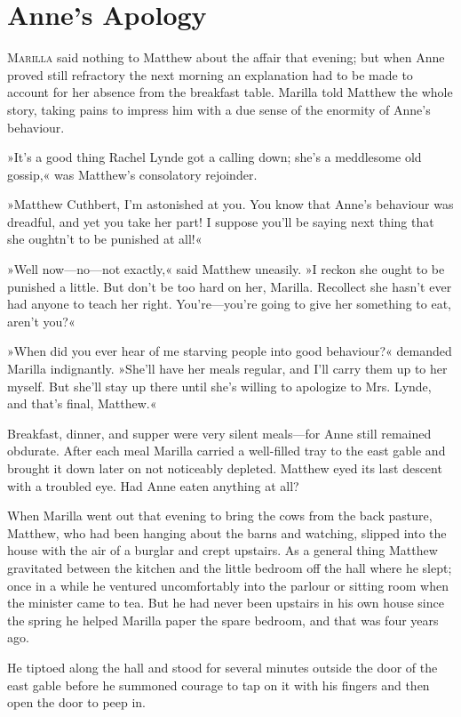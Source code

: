 \chapter{Anne's Apology}

\lettrine[lines=4]{M}{arilla} said nothing to Matthew about the affair that evening; but when Anne proved still refractory the next morning an explanation had to be made to account for her absence from the breakfast table. Marilla told Matthew the whole story, taking pains to impress him with a due sense of the enormity of Anne's behaviour.

»It's a good thing Rachel Lynde got a calling down; she's a meddlesome old gossip,« was Matthew's consolatory rejoinder.

»Matthew Cuthbert, I'm astonished at you. You know that Anne's behaviour was dreadful, and yet you take her part! I suppose you'll be saying next thing that she oughtn't to be punished at all!«

»Well now—no—not exactly,« said Matthew uneasily. »I reckon she ought to be punished a little. But don't be too hard on her, Marilla. Recollect she hasn't ever had anyone to teach her right. You're—you're going to give her something to eat, aren't you?«

»When did you ever hear of me starving people into good behaviour?« demanded Marilla indignantly. »She'll have her meals regular, and I'll carry them up to her myself. But she'll stay up there until she's willing to apologize to Mrs. Lynde, and that's final, Matthew.«

Breakfast, dinner, and supper were very silent meals—for Anne still remained obdurate. After each meal Marilla carried a well-filled tray to the east gable and brought it down later on not noticeably depleted. Matthew eyed its last descent with a troubled eye. Had Anne eaten anything at all?

When Marilla went out that evening to bring the cows from the back pasture, Matthew, who had been hanging about the barns and watching, slipped into the house with the air of a burglar and crept upstairs. As a general thing Matthew gravitated between the kitchen and the little bedroom off the hall where he slept; once in a while he ventured uncomfortably into the parlour or sitting room when the minister came to tea. But he had never been upstairs in his own house since the spring he helped Marilla paper the spare bedroom, and that was four years ago.

He tiptoed along the hall and stood for several minutes outside the door of the east gable before he summoned courage to tap on it with his fingers and then open the door to peep in.

